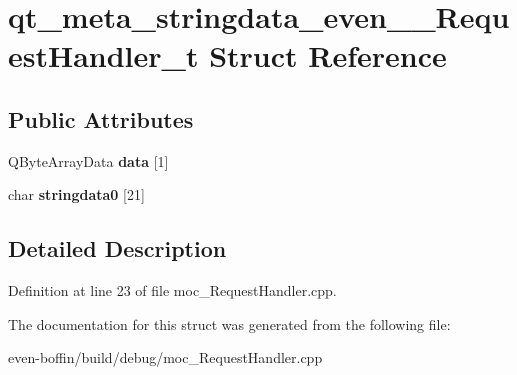 \hypertarget{structqt__meta__stringdata__even_____request_handler__t}{}\section{qt\+\_\+meta\+\_\+stringdata\+\_\+even\+\_\+\+\_\+\+Request\+Handler\+\_\+t Struct Reference}
\label{structqt__meta__stringdata__even_____request_handler__t}
\subsection*{Public Attributes}
\begin{DoxyCompactItemize}
\item 
\mbox{\label{structqt__meta__stringdata__even_____request_handler__t_a66d975fd8f79770db1b42bd66d8176ed}} 
Q\+Byte\+Array\+Data {\bfseries data} \mbox{[}1\mbox{]}
\item 
\mbox{\label{structqt__meta__stringdata__even_____request_handler__t_a64695cc4d6657ab014750af20cc289fa}} 
char {\bfseries stringdata0} \mbox{[}21\mbox{]}
\end{DoxyCompactItemize}


\subsection{Detailed Description}


Definition at line 23 of file moc\+\_\+\+Request\+Handler.\+cpp.



The documentation for this struct was generated from the following file\+:\begin{DoxyCompactItemize}
\item 
even-\/boffin/build/debug/moc\+\_\+\+Request\+Handler.\+cpp\end{DoxyCompactItemize}
